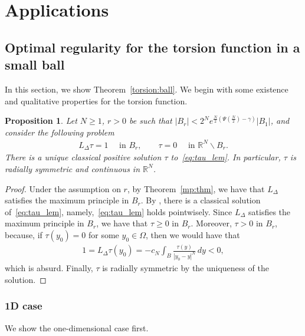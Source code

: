 \documentclass[11pt]{article}
\newcommand{\R}{\mathbb{R}}
\numberwithin{equation}{section}
\newtheorem{proposition}[theorem]{Proposition}
\begin{document}
\section{Applications}\label{app:sec}

\subsection{Optimal regularity for the torsion function in a small ball}

In this section, we show Theorem~\ref{torsion:ball}. We begin with some existence and qualitative properties for the torsion function.

\begin{proposition}\label{prop:tor}
Let $N\geq 1$, $r>0$ be such that $|B_r|<2^N e^{\frac{N}{2}(\Psi(\frac{N}{2})-\gamma)}|B_1|$, and consider the following problem
\begin{align}\label{eq:tau_lem}
    L_\Delta \tau = 1\quad \text{ in }B_r,\qquad \tau=0\quad \text{ in }\R^N \backslash B_r.
\end{align}
There is a unique classical positive solution $\tau$ to~\eqref{eq:tau_lem}. In particular, $\tau$ is radially symmetric and continuous in $\R^N$.
%
\end{proposition}

\begin{proof}
Under the assumption on $r$, by Theorem~\ref{mp:thm}, we have that $L_{\Delta}$ satisfies the maximum principle in $B_r$.  By \cite[Theorem 1.1]{CS22}, there is a classical solution of~\eqref{eq:tau_lem}, namely,~\eqref{eq:tau_lem} holds pointwisely.  Since $L_{\Delta}$ satisfies the maximum principle in $B_r$, we have that $\tau \geq 0$ in $B_r$. Moreover, $\tau>0$ in $B_r$, because, if $\tau(y_0)=0$ for some $y_0\in \Omega$, then we would have that 
\begin{align*}
1=L_\Delta \tau(y_0)=-c_N\int_{B}\frac{\tau(y)}{|y_0-y|^N}\, dy<0,
\end{align*}
which is absurd. Finally, $\tau$ is radially symmetric by the uniqueness of the solution. 
%
\end{proof}


\subsubsection{1D case}
We show the one-dimensional case first.
\end{document}
